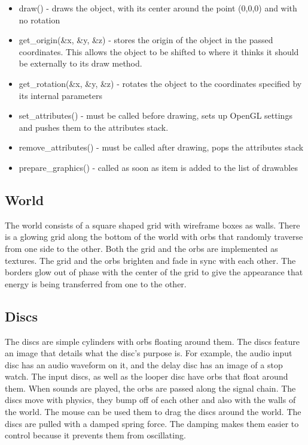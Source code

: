 \documentclass[pdftext,twoside,10pt]{article}
\begin{document}
\begin{itemize}
    \item draw() - draws the object, with its center around the point (0,0,0) and with no rotation
    \item get\_origin(\&x, \&y, \&z) - stores the origin of the object in the passed coordinates. This allows the object to be shifted to where it thinks it should be externally to its draw method.
    \item get\_rotation(\&x, \&y, \&z) - rotates the object to the coordinates specified by its internal parameters
    \item set\_attributes() - must be called before drawing, sets up OpenGL settings and pushes them to the attributes stack.
    \item remove\_attributes() - must be called after drawing, pops the attributes stack
    \item prepare\_graphics() - called as soon as item is added to the list of drawables 
\end{itemize} 

\subsection{World}
The world consists of a square shaped grid with wireframe boxes as walls. There is a glowing grid along the bottom of the world with orbs that randomly traverse from one side to the other. Both the grid and the orbs are implemented as textures. The grid and the orbs brighten and fade in sync with each other. The borders glow out of phase with the center of the grid to give the appearance that energy is being transferred from one to the other.

\subsection{Discs}
The discs are simple cylinders with orbs floating around them. The discs feature an image that details what the disc's purpose is. For example, the audio input disc has an audio waveform on it, and the delay disc has an image of a stop watch. The input discs, as well as the looper disc have orbs that float around them. When sounds are played, the orbs are passed along the signal chain. The discs move with physics, they bump off of each other and also with the walls of the world. The mouse can be used them to drag the discs around the world. The discs are pulled with a damped spring force. The damping makes them easier to control because it prevents them from oscillating.
\end{document}

